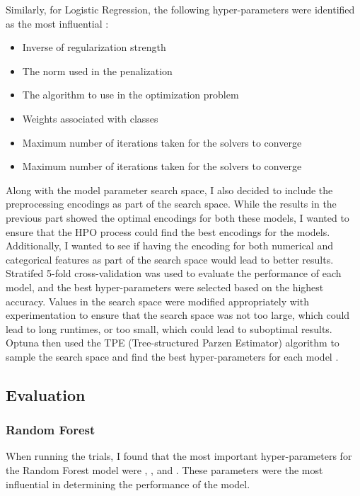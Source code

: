 \documentclass{article}
\begin{document}
\noindent Similarly, for Logistic Regression, the following hyper-parameters were identified as the most influential \cite{Brownlee_2020}:

\begin{itemize}
  \item {} Inverse of regularization strength
  \item {} The norm used in the penalization
  \item {} The algorithm to use in the optimization problem
  \item {} Weights associated with classes 
  \item {} Maximum number of iterations taken for the solvers to converge
  \item {} Maximum number of iterations taken for the solvers to converge
\end{itemize}

\noindent Along with the model parameter search space, I also decided to include the preprocessing encodings as part of the search space. While the results in the previous part showed the optimal encodings for both these models, I wanted to ensure that the HPO process could find the best encodings for the models. Additionally, I wanted to see if having the  encoding for both numerical and categorical features as part of the search space would lead to better results. Stratifed 5-fold cross-validation was used to evaluate the performance of each model, and the best hyper-parameters were selected based on the highest accuracy. Values in the search space were modified appropriately with experimentation to ensure that the search space was not too large, which could lead to long runtimes, or too small, which could lead to suboptimal results. Optuna then used the TPE (Tree-structured Parzen Estimator) algorithm to sample the search space and find the best hyper-parameters for each model \cite{optuna_2019}.

\subsection{Evaluation}

\subsubsection{Random Forest}
When running the trials, I found that the most important hyper-parameters for the Random Forest model were , , and . These parameters were the most influential in determining the performance of the model. 
\end{document}
